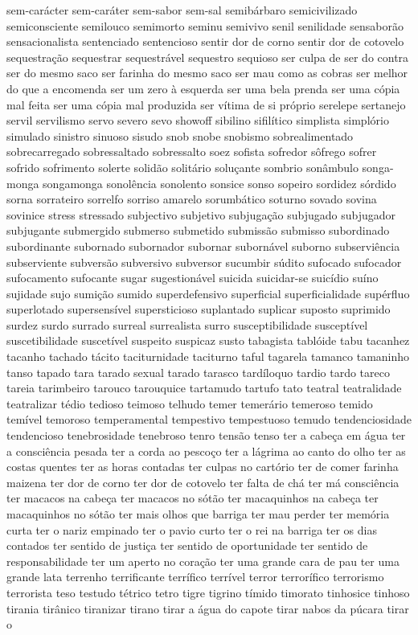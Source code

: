 sem-car\'{a}cter sem-car\'{a}ter sem-sabor sem-sal semib\'{a}rbaro semicivilizado semiconsciente semilouco semimorto seminu semivivo senil senilidade sensabor\~ao sensacionalista sentenciado sentencioso sentir dor de corno sentir dor de cotovelo sequestra\c{c}\~ao sequestrar sequestr\'{a}vel sequestro sequioso ser culpa de ser do contra ser do mesmo saco ser farinha do mesmo saco ser mau como as cobras ser melhor do que a encomenda ser um zero \`{a} esquerda ser uma bela prenda ser uma c\'{o}pia mal feita ser uma c\'{o}pia mal produzida ser v\'{i}tima de si pr\'{o}prio serelepe sertanejo servil servilismo servo severo sevo showoff sibilino sifil\'{i}tico simplista simpl\'{o}rio simulado sinistro sinuoso sisudo snob snobe snobismo sobrealimentado sobrecarregado sobressaltado sobressalto soez sofista sofredor s\^{o}frego sofrer sofrido sofrimento solerte solid\~ao solit\'{a}rio solu\c{c}ante sombrio son\^{a}mbulo songa-monga songamonga sonol\^{e}ncia sonolento sonsice sonso sopeiro sordidez s\'{o}rdido sorna sorrateiro sorrelfo sorriso amarelo sorumb\'{a}tico soturno sovado sovina sovinice stress stressado subjectivo subjetivo subjuga\c{c}\~ao subjugado subjugador subjugante submergido submerso submetido submiss\~ao submisso subordinado subordinante subornado subornador subornar suborn\'{a}vel suborno subservi\^{e}ncia subserviente subvers\~ao subversivo subversor sucumbir s\'{u}dito sufocado sufocador sufocamento sufocante sugar sugestion\'{a}vel suicida suicidar-se suic\'{i}dio su\'{i}no sujidade sujo sumi\c{c}\~ao sumido superdefensivo superficial superficialidade sup\'{e}rfluo superlotado supersens\'{i}vel supersticioso suplantado suplicar suposto suprimido surdez surdo surrado surreal surrealista surro susceptibilidade suscept\'{i}vel suscetibilidade suscet\'{i}vel suspeito suspicaz susto tabagista tabl\'{o}ide tabu tacanhez tacanho tachado t\'{a}cito taciturnidade taciturno taful tagarela tamanco tamaninho tanso tapado tara tarado sexual tarado tarasco tard\'{i}loquo tardio tardo tareco tareia tarimbeiro tarouco tarouquice tartamudo tartufo tato teatral teatralidade teatralizar t\'{e}dio tedioso teimoso telhudo temer temer\'{a}rio temeroso temido tem\'{i}vel temoroso temperamental tempestivo tempestuoso temudo tendenciosidade tendencioso tenebrosidade tenebroso tenro tens\~ao tenso ter a cabe\c{c}a em \'{a}gua ter a consci\^{e}ncia pesada ter a corda ao pesco\c{c}o ter a l\'{a}grima ao canto do olho ter as costas quentes ter as horas contadas ter culpas no cart\'{o}rio ter de comer farinha maizena ter dor de corno ter dor de cotovelo ter falta de ch\'{a} ter m\'{a} consci\^{e}ncia ter macacos na cabe\c{c}a ter macacos no s\'{o}t\~ao ter macaquinhos na cabe\c{c}a ter macaquinhos no s\'{o}t\~ao ter mais olhos que barriga ter mau perder ter mem\'{o}ria curta ter o nariz empinado ter o pavio curto ter o rei na barriga ter os dias contados ter sentido de justi\c{c}a ter sentido de oportunidade ter sentido de responsabilidade ter um aperto no cora\c{c}\~ao ter uma grande cara de pau ter uma grande lata terrenho terrificante terr\'{i}fico terr\'{i}vel terror terror\'{i}fico terrorismo terrorista teso testudo t\'{e}trico tetro tigre tigrino t\'{i}mido timorato tinhosice tinhoso tirania tir\^{a}nico tiranizar tirano tirar a \'{a}gua do capote tirar nabos da p\'{u}cara tirar o 